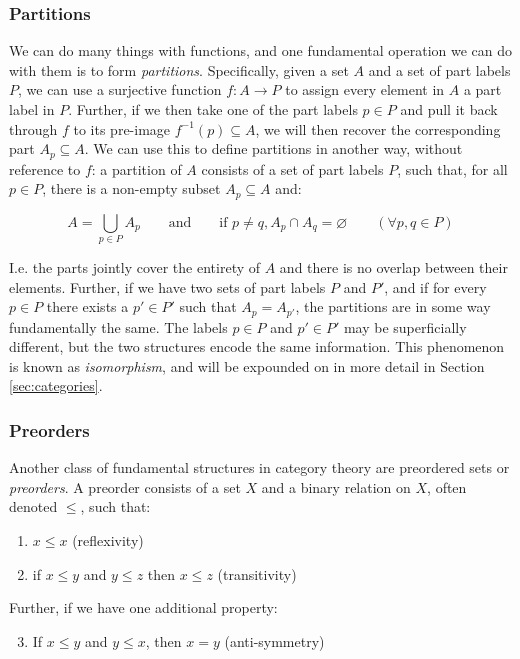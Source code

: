 \documentclass[12pt,a4paper]{article}
\begin{document}
\subsubsection{Partitions}

We can do many things with functions, and one fundamental operation we can do with them is to form \textit{partitions}. Specifically, given a set $A$ and a set of part labels $P$, we can use a surjective function $f: A \to P$ to assign every element in $A$ a part label in $P$. Further, if we then take one of the part labels $p \in P$ and pull it back through $f$ to its pre-image $f^{-1}(p) \subseteq A$, we will then recover the corresponding part $A_p \subseteq A$. We can use this to define partitions in another way, without reference to $f$: a partition of $A$ consists of a set of part labels $P$, such that, for all $p \in P$, there is a non-empty subset $A_p \subseteq A$ and:

$$A = \bigcup_{p \in P} A_p \qquad \text{and} \qquad \text{if } p \neq q, A_p \cap A_q = \varnothing \qquad (\forall p, q \in P)$$

I.e. the parts jointly cover the entirety of $A$ and there is no overlap between their elements. Further, if we have two sets of part labels $P$ and $P'$, and if for every $p \in P$ there exists a $p' \in P'$ such that $A_p = A_{p'}$, the partitions are in some way fundamentally the same. The labels $p \in P$ and $p' \in P'$ may be superficially different, but the two structures encode the same information. This phenomenon is known as \textit{isomorphism}, and will be expounded on in more detail in Section \ref{sec:categories}.  

\subsubsection{Preorders}

Another class of fundamental structures in category theory are preordered sets or \textit{preorders}. A preorder consists of a set $X$ and a binary relation on $X$, often denoted $\leq$, such that:

\begin{enumerate}
\item $x \leq x$ (reflexivity)
\item if $x \leq y$ and $y \leq z$ then $x \leq z$ (transitivity)
\end{enumerate}

Further, if we have one additional property:

\begin{enumerate}
\setcounter{enumi}{2}
\item If $x \leq y$ and $y \leq x$, then $x = y$ (anti-symmetry)
\end{enumerate}
\end{document}
